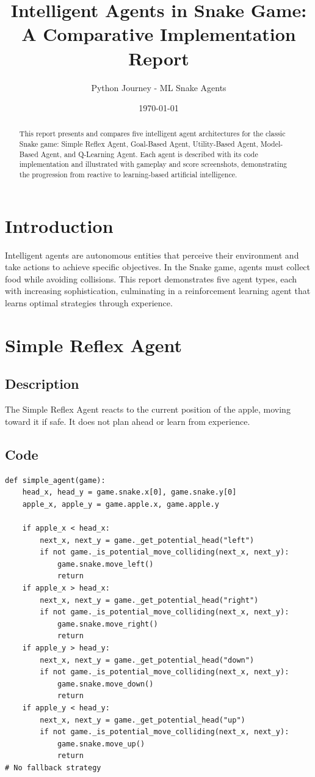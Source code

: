 \documentclass[11pt,a4paper]{article}
\title{Intelligent Agents in Snake Game: \newline A Comparative Implementation Report}
\author{Python Journey - ML Snake Agents}
\date{\today}
\begin{document}
\maketitle

\begin{abstract}
This report presents and compares five intelligent agent architectures for the classic Snake game: Simple Reflex Agent, Goal-Based Agent, Utility-Based Agent, Model-Based Agent, and Q-Learning Agent. Each agent is described with its code implementation and illustrated with gameplay and score screenshots, demonstrating the progression from reactive to learning-based artificial intelligence.
\end{abstract}

\section{Introduction}
Intelligent agents are autonomous entities that perceive their environment and take actions to achieve specific objectives. In the Snake game, agents must collect food while avoiding collisions. This report demonstrates five agent types, each with increasing sophistication, culminating in a reinforcement learning agent that learns optimal strategies through experience.

\section{Simple Reflex Agent}
\subsection{Description}
The Simple Reflex Agent reacts to the current position of the apple, moving toward it if safe. It does not plan ahead or learn from experience.

\subsection{Code}
\begin{lstlisting}[caption=Simple Reflex Agent]
def simple_agent(game):
    head_x, head_y = game.snake.x[0], game.snake.y[0]
    apple_x, apple_y = game.apple.x, game.apple.y

    if apple_x < head_x:
        next_x, next_y = game._get_potential_head("left")
        if not game._is_potential_move_colliding(next_x, next_y):
            game.snake.move_left()
            return
    if apple_x > head_x:
        next_x, next_y = game._get_potential_head("right")
        if not game._is_potential_move_colliding(next_x, next_y):
            game.snake.move_right()
            return
    if apple_y > head_y:
        next_x, next_y = game._get_potential_head("down")
        if not game._is_potential_move_colliding(next_x, next_y):
            game.snake.move_down()
            return
    if apple_y < head_y:
        next_x, next_y = game._get_potential_head("up")
        if not game._is_potential_move_colliding(next_x, next_y):
            game.snake.move_up()
            return
# No fallback strategy
\end{lstlisting}
\end{document}
